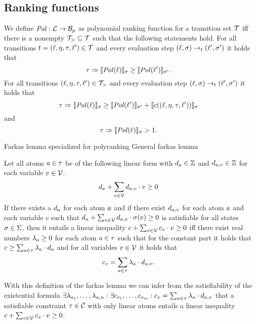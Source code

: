 \subsection{Ranking functions}

\begin{definition} 
	We define $\mathit{Pol}: \mathcal{L} \rightarrow \mathcal{B}_p$ as polynomial ranking function for a transition set $\mathcal{T}$ iff there is a nonempty $\mathcal{T}_{>} \subseteq \mathcal{T}$ such that the following statements hold.
        For all transitions $t = (\ell, \eta, \tau, \ell') \in \mathcal{T}$ and every evaluation step $(\ell, \sigma) \rightarrow_t (\ell', \sigma')$ it holds that
	\[ \tau \Rightarrow \llbracket \mathit{Pol}(\ell) \rrbracket_{\sigma} \geq \llbracket \mathit{Pol}(\ell') \rrbracket_{\sigma'}. \]
        For all transitions $(\ell, \eta, \tau, \ell') \in \mathcal{T}_{>}$ and every evaluation step $(\ell, \sigma) \rightarrow_t (\ell', \sigma')$ it holds that        
	\[ \tau \Rightarrow \llbracket \mathit{Pol}(\ell) \rrbracket_{\sigma} \geq \llbracket \mathit{Pol}(\ell') \rrbracket_{\sigma'} + \llbracket c((\ell, \eta, \tau, \ell')) \rrbracket_{\sigma} \]
        and
	\[ \tau \Rightarrow \llbracket \mathit{Pol}(\ell) \rrbracket_{\sigma} > 1. \]
\end{definition}





Farkas lemma specialized for polyranking \cite{bradley2005polyranking}
General farkas lemma \cite{schrijver1998theory}
\begin{definition}
  Let all atoms $a \in \tau$ be of the following linear form with $d_a \in \mathbb{Z}$ and $d_{a,v} \in \mathbb{Z}$ for each variable $v \in \mathcal{V}$.
  \[ d_a + \sum_{v \in \mathcal{V}} d_{a,v} \cdot v \geq 0 \]
  If there exists a $d_a$ for each atom $a$ and if there exist $d_{a,v}$ for each atom $a$ and each variable $v$ such that $d_a + \sum_{v \in \mathcal{V}} d_{a,v} \cdot \sigma(v) \geq 0$ is satisfiable for all states $\sigma \in \Sigma$, then it entails a linear inequality $c + \sum_{v \in \mathcal{V}} c_v \cdot v \geq 0$ iff there exist real numbers $\lambda_a \geq 0$ for each atom $a \in \tau$ such that for the constant part it holds that $c \geq \sum_{a \in \tau} \lambda_a \cdot d_a$ and for all variables $v \in \mathcal{V}$ it holds that
  \[ c_v = \sum_{a \in \tau} \lambda_a \cdot d_{a,v}. \]
\end{definition}
With this definition of the farkas lemma we can infer from the satisfiability of the existential formula $\exists \lambda_{a_1}, \dots, \lambda_{a,n}: \exists c_{v_1}, \dots, c_{v_m}: c_v = \sum_{a \in \tau} \lambda_a \cdot d_{a,v}$ that a satisfiable constraint $\tau \in \mathcal{C}$ with only linear atoms entails a linear inequality $c + \sum_{v \in \mathcal{V}} c_v \cdot v \geq 0$.
